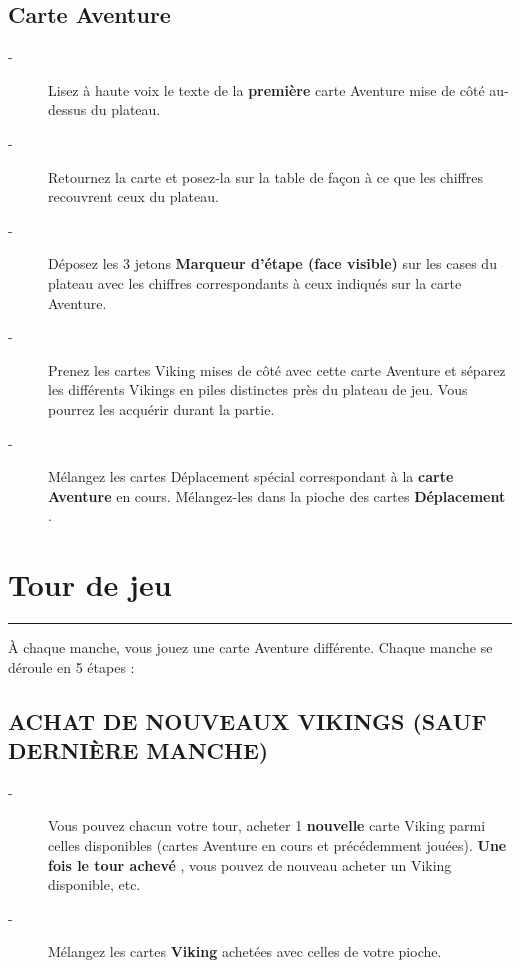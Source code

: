 \documentclass{scrartcl}%
\begin{document}
\subsection{ Carte Aventure
}%
\label{subsec:CarteAventure}%
\begin{description}%
\item[{-} ]%
%
 Lisez à haute voix le texte de la %
\textbf{première}%
\textit{ }%
 carte Aventure mise de côté au{-}dessus du plateau.
%
\item[{-} ]%
%
 Retournez la carte et posez{-}la sur la table de façon à ce que les chiffres recouvrent ceux du plateau.
%
\item[{-} ]%
%
 Déposez les 3 jetons %
\textbf{Marqueur d'étape (face visible)}%
\textit{ }%
 sur les cases du plateau avec les chiffres correspondants à ceux indiqués sur la carte Aventure.
%
\item[{-} ]%
%
 Prenez les cartes Viking mises de côté avec cette carte Aventure et séparez les différents Vikings en piles distinctes près du plateau de jeu. Vous pourrez les acquérir durant la partie.
%
\item[{-} ]%
%
 Mélangez les cartes Déplacement spécial correspondant à la %
\textbf{carte Aventure}%
\textit{ }%
 en cours. Mélangez{-}les dans la pioche des cartes %
\textbf{Déplacement}%
. 
%
\end{description}

%
\section{ Tour de jeu
}%
\label{sec:Tourdejeu}%
\rule{18cm}{0.07cm}\break%
À chaque manche, vous jouez une carte Aventure différente. Chaque manche se déroule en 5 étapes :


%
\subsection{ ACHAT DE NOUVEAUX VIKINGS (SAUF DERNIÈRE MANCHE)
}%
\label{subsec:ACHATDENOUVEAUXVIKINGS(SAUFDERNIREMANCHE)}%
\begin{description}%
\item[{-} ]%
%
 Vous pouvez chacun votre tour, acheter 1%
\textbf{ nouvelle}%
\textit{ }%
 carte Viking parmi celles disponibles (cartes Aventure en cours et précédemment jouées).%
\textbf{ Une fois le tour achevé}%
, vous pouvez de nouveau acheter un Viking disponible, etc.
%
\item[{-} ]%
%
 Mélangez les cartes %
\textbf{Viking}%
\textit{ }%
 achetées avec celles de votre pioche.
%
\end{description}
\end{document}
